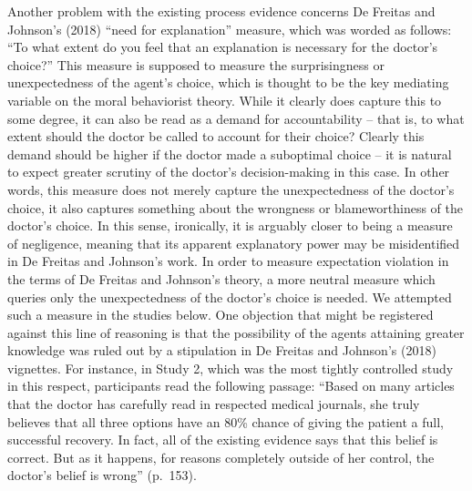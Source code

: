 \documentclass[
  man, donotrepeattitle,floatsintext]{apa6}
\begin{document}
Another problem with the existing process evidence concerns De Freitas and Johnson's (2018) ``need for explanation'' measure, which was worded as follows: ``To what extent do you feel that an explanation is necessary for the doctor's choice?'' This measure is supposed to measure the surprisingness or unexpectedness of the agent's choice, which is thought to be the key mediating variable on the moral behaviorist theory. While it clearly does capture this to some degree, it can also be read as a demand for accountability -- that is, to what extent should the doctor be called to account for their choice? Clearly this demand should be higher if the doctor made a suboptimal choice -- it is natural to expect greater scrutiny of the doctor's decision-making in this case. In other words, this measure does not merely capture the unexpectedness of the doctor's choice, it also captures something about the wrongness or blameworthiness of the doctor's choice. In this sense, ironically, it is arguably closer to being a measure of negligence, meaning that its apparent explanatory power may be misidentified in De Freitas and Johnson's work. In order to measure expectation violation in the terms of De Freitas and Johnson's theory, a more neutral measure which queries only the unexpectedness of the doctor's choice is needed. We attempted such a measure in the studies below. One objection that might be registered against this line of reasoning is that the possibility of the agents attaining greater knowledge was ruled out by a stipulation in De Freitas and Johnson's (2018) vignettes. For instance, in Study 2, which was the most tightly controlled study in this respect, participants read the following passage: ``Based on many articles that the doctor has carefully read in respected medical journals, she truly believes that all three options have an 80\% chance of giving the patient a full, successful recovery. In fact, all of the existing evidence says that this belief is correct. But as it happens, for reasons completely outside of her control, the doctor's belief is wrong'' (p.~153).\\
\end{document}
